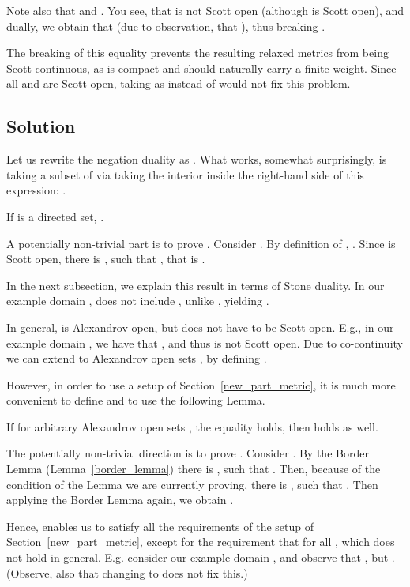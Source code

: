 Note also that  and . 
You see, that  is not Scott open (although 
 is Scott open),
and dually, we obtain that 
(due to observation, that ), thus breaking  .

The breaking of this equality prevents the resulting relaxed metrics
from being Scott continuous, as  is compact and should naturally
carry a finite weight. Since all  and  are Scott open,
taking  as  instead of  would not fix this problem. 

\subsection{Solution}

Let us rewrite the negation duality as .
What works, somewhat surprisingly, is taking a subset of  via
taking the interior inside the right-hand side of this expression:
.

\begin{Lemma}\label{sec:jgood}
If  is a directed set, 
.
\end{Lemma}
\Proof
A potentially non-trivial part is to prove
.
Consider . By definition of ,
. Since  is Scott open,
there is , such that , that is
.
\eproof

In the next subsection, we explain this result in terms
of Stone duality. In our example domain , 
does not include , unlike , yielding
.

In general,  is Alexandrov open, but does not have to
be Scott open. E.g., in our example domain ,
we have that
, and thus  is not Scott open.
Due to co-continuity we can extend  to Alexandrov open
sets , by defining .

However, in order to use a setup of Section~\ref{new_part_metric},
it is much more convenient to define  and to use
the following Lemma.

\begin{Lemma} If for arbitrary Alexandrov open sets ,
the equality  holds,
then  holds as well.
\end{Lemma}
\Proof
The potentially non-trivial direction is to prove
.
Consider . By the Border Lemma (Lemma~\ref{border_lemma})
there is , such that . Then, because of the
condition of the Lemma we are currently proving, there is ,
such that . Then applying the Border Lemma again,
we obtain .
\eproof

Hence,  enables us to satisfy all the requirements
of the setup of Section~\ref{new_part_metric}, except for the requirement
that for all , which does not hold
in general. E.g. consider our example domain , and observe that
, but 
. (Observe, also that changing
 to  does not fix this.)

